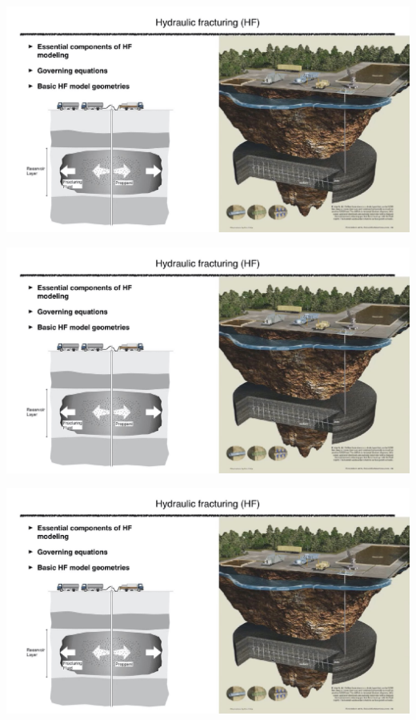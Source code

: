 \documentclass[main.tex]{subfiles}
\begin{document}
\includegraphics[width=\textwidth, page=29]{HF_slides.pdf}

\includegraphics[width=\textwidth, page=30]{HF_slides.pdf}

\includegraphics[width=\textwidth, page=31]{HF_slides.pdf}
\end{document}
